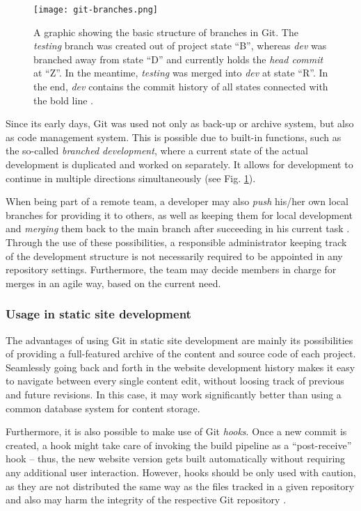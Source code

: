 \begin{figure} %
    \centering
    \texttt{[image: git-branches.png]}
    \caption{A graphic showing the basic structure of branches in Git. The \emph{testing} branch was created out of project state ``B'', whereas \emph{dev} was branched away from state ``D'' and currently holds the \emph{head commit} at ``Z''. In the meantime, \emph{testing} was merged into \emph{dev} at state ``R''. In the end, \emph{dev} contains the commit history of all states connected with the bold line \cite[p. 92f]{loeliger2012version}.}
    \label{fig:git-branches}
\end{figure}
%

Since its early days, Git was used not only as back-up or archive system, but also as code management system. This is possible due to built-in functions, such as the so-called \emph{branched development}, where a current state of the actual development is duplicated and worked on separately. It allows for development to continue in multiple directions simultaneously \cite[89]{loeliger2012version} (see Fig. \ref{fig:git-branches}).

When being part of a remote team, a developer may also \emph{push} his/her own local branches for providing it to others, as well as keeping them for local development and \emph{merging} them back to the main branch after succeeding in his current task \cite[207]{dhillon2016}. Through the use of these possibilities, a responsible administrator keeping track of the development structure is not necessarily required to be appointed in any repository settings. Furthermore, the team may decide members in charge for merges in an agile way, based on the current need.

\subsubsection{Usage in static site development}
The advantages of using Git in static site development are mainly its possibilities of providing a full-featured archive of the content and source code of each project. Seamlessly going back and forth in the website development history makes it easy to navigate between every single content edit, without loosing track of previous and future revisions. In this case, it may work significantly better than using a common database system for content storage.

Furthermore, it is also possible to make use of Git \emph{hooks}. Once a new commit is created, a hook might take care of invoking the build pipeline as a ``post-receive'' hook -- thus, the new website version gets built automatically without requiring any additional user interaction. However, hooks should be only used with caution, as they are not distributed the same way as the files tracked in a given repository and also may harm the integrity of the respective Git repository \cite[p. 285f]{loeliger2012version}.
